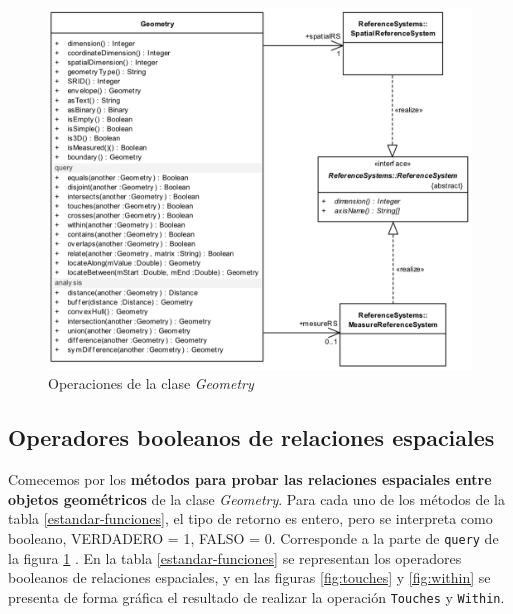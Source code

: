\begin{figure}[H]
	\centering
	\includegraphics[width=1\linewidth]{imagenes/capitulo4/geometry-class}
	\caption{Operaciones de la clase \textit{Geometry} \cite{estandar}}
	\label{fig:geometry-class}
\end{figure}

\subsection{Operadores booleanos de relaciones espaciales}

Comecemos por los \textbf{métodos para probar las relaciones espaciales entre objetos geométricos} de la clase \textit{Geometry}. Para cada uno de los métodos de la tabla \ref{estandar-funciones}, el tipo de retorno es entero, pero se interpreta como booleano, VERDADERO = 1, FALSO = 0. Corresponde a la parte de \texttt{query} de la figura \ref{fig:geometry-class} \cite{estandar, wkt-database}. En la tabla \ref{estandar-funciones} se representan los operadores booleanos de relaciones espaciales, y en las figuras \ref{fig:touches} y \ref{fig:within} se presenta de forma gráfica el resultado de realizar la operación \texttt{Touches} y \texttt{Within}.




 


